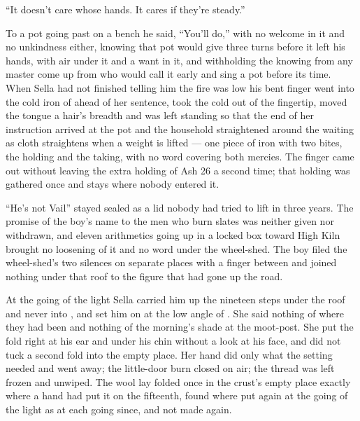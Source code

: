 “It doesn't care whose hands. It cares if they're steady.”

To a pot going past on a bench he said, “You'll do,” with no welcome in it and no unkindness either, knowing  that pot would give three turns before it left his hands, with air under it and a want in it, and withholding the knowing from any master come up from  who would call it early and sing a pot before its time. When Sella had not finished telling him the fire was low his bent finger went into the cold iron of  ahead of her sentence, took the cold out of the fingertip, moved the tongue a hair's breadth and was left standing so that the end of her instruction arrived at the pot and the household straightened around the waiting as cloth straightens when a weight is lifted — one piece of iron with two bites, the holding and the taking, with no  word covering both mercies. The finger came out without leaving the extra holding of Ash 26 a second time; that holding was gathered once and stays where nobody entered it.

“He's not Vail” stayed sealed as a lid nobody had tried to lift in three years. The promise of the boy's name to the men who burn slates was neither given nor withdrawn, and eleven arithmetics going up  in a locked box toward High Kiln brought no loosening of it and no word under the wheel-shed. The boy filed the wheel-shed's two silences on separate places with a finger between and joined nothing under that roof to the figure that had gone up the road.

\scenebreak

At the going of the light Sella carried him up the nineteen steps under the roof and never into , and set him on  at the low angle of . She said nothing of where they had been and nothing of the morning's shade at the moot-post. She put the fold right at his ear and under his chin without a look at his face, and did not tuck a second fold into the empty place. Her hand did only what the setting needed and went away; the little-door burn closed on air; the thread was left frozen and unwiped. The wool lay folded once in the crust's empty place exactly where a hand had put it on the fifteenth, found where put again at the going of the light as at each going since, and not made again.

